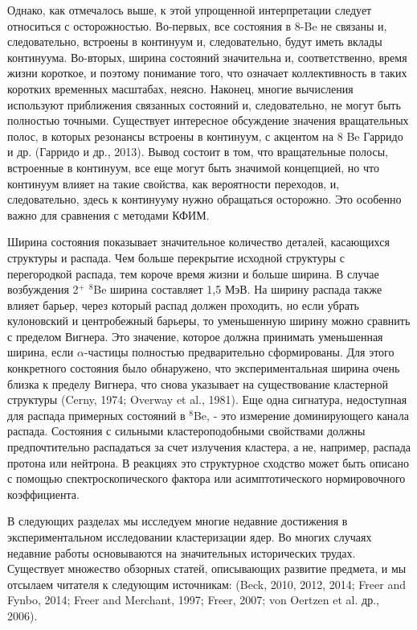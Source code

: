 \documentclass[fontsize=14pt]{scrreport}
\begin{document}
Однако, как отмечалось выше, к этой упрощенной интерпретации следует относиться с осторожностью. Во-первых, все состояния в 8-Be не связаны и, следовательно, встроены в континуум и, следовательно, будут иметь вклады континуума. Во-вторых, ширина состояний значительна и, соответственно, время жизни короткое, и поэтому понимание того, что означает коллективность в таких коротких временных масштабах, неясно. Наконец, многие вычисления используют приближения связанных состояний и, следовательно, не могут быть полностью точными. Существует интересное обсуждение значения вращательных полос, в которых резонансы встроены в континуум, с акцентом на 8 Be Гарридо и др. (Гарридо и др., 2013). Вывод состоит в том, что вращательные полосы, встроенные в континуум, все еще могут быть значимой концепцией, но что континуум влияет на такие свойства, как вероятности переходов, и, следовательно, здесь к континууму нужно обращаться осторожно. Это особенно важно для сравнения с методами КФИМ.

Ширина состояния показывает значительное количество деталей, касающихся структуры и распада. Чем больше перекрытие исходной структуры с перегородкой распада, тем короче время жизни и больше ширина. В случае возбуждения 2$^{+}$ $^{8}$Be ширина составляет 1,5 МэВ. На ширину распада также влияет барьер, через который распад должен проходить, но если убрать кулоновский и центробежный барьеры, то уменьшенную ширину можно сравнить с пределом Вигнера. Это значение, которое должна принимать уменьшенная ширина, если $\alpha$-частицы полностью предварительно сформированы. Для этого конкретного состояния было обнаружено, что экспериментальная ширина очень близка к пределу Вигнера, что снова указывает на существование кластерной структуры (Cerny, 1974; Overway et al., 1981). Еще одна сигнатура, недоступная для распада примерных состояний в $^{8}$Be, - это измерение доминирующего канала распада. Состояния с сильными кластероподобными свойствами должны предпочтительно распадаться за счет излучения кластера, а не, например, распада протона или нейтрона. В реакциях это структурное сходство может быть описано с помощью спектроскопического фактора или асимптотического нормировочного коэффициента.

В следующих разделах мы исследуем многие недавние достижения в экспериментальном исследовании кластеризации ядер. Во многих случаях недавние работы основываются на значительных исторических трудах. Существует множество обзорных статей, описывающих развитие предмета, и мы отсылаем читателя к следующим источникам: (Beck, 2010, 2012, 2014; Freer and Fynbo, 2014; Freer and Merchant, 1997; Freer, 2007; von Oertzen et al. др., 2006).
\end{document}
